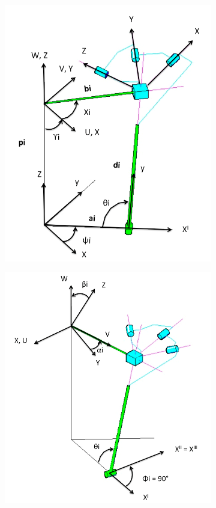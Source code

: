 \documentclass[titlepage, letterpaper, fleqn]{article}
\begin{document}
\begin{figure}[htbp]
    \centering
    \begin{subfigure}[b]{0.45\textwidth}
        \includegraphics[width=\linewidth]{fig_schema_a}
    \end{subfigure}
    \begin{subfigure}[b]{0.45\textwidth}
        \includegraphics[width=\linewidth]{fig_schema_b}

\end{subfigure}
\end{figure}
\end{document}
